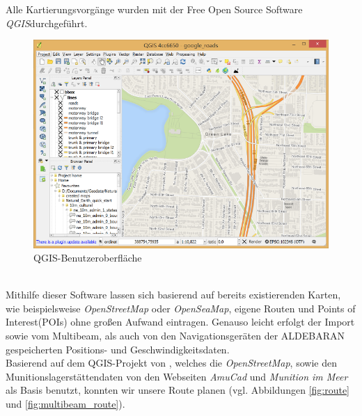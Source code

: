 Alle Kartierungsvorgänge wurden mit der Free Open Source Software\\
\emph{QGIS}\cite{qgis}durchgeführt.
\begin{figure}[ht]
    \centering
    \includegraphics[width=.4\linewidth]{Bilder/QGIS/about-screenshot.png}
    \caption[fig:qgisabout]{QGIS-Benutzeroberfläche}
\end{figure}
\\Mithilfe dieser Software lassen sich basierend auf bereits existierenden Karten, 
wie beispielsweise \emph{OpenStreetMap}\cite{ostrm} oder \emph{OpenSeaMap}\cite{oseam},
eigene Routen und Points of \\Interest(POIs) ohne großen Aufwand eintragen. Genauso 
leicht erfolgt der Import sowie vom Multibeam,  als auch von den Navigationsgeräten 
der ALDEBARAN gespeicherten Positions- und Geschwindigkeitsdaten.\\


Basierend auf dem QGIS-Projekt von \jens, welches die \emph{OpenStreetMap}, sowie den Munitionslagerstättendaten von den Webseiten
\emph{AmuCad}\cite{amucad} und \emph{Munition im Meer}\cite{muninmeer}
als Basis benutzt, konnten wir unsere Route planen (vgl. Abbildungen \ref{fig:route} und \ref{fig:multibeam_route}).

